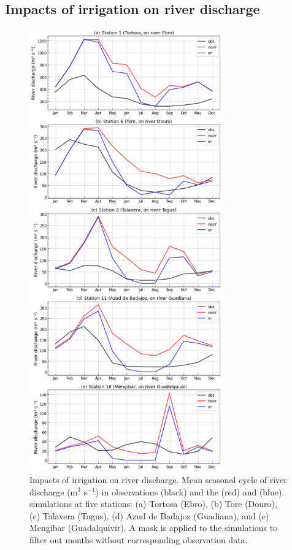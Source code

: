 \subsection{Impacts of irrigation on river discharge}

\begin{figure}[htbp]
    \centering
    \includegraphics[width=8.3cm]{images/chap4/f05.png} 
    \caption{Impacts of irrigation on river discharge. Mean seasonal cycle of river discharge (m$^3$ s$^{-1}$) in observations (black) and the \noirr (red) and \irr (blue) simulations at five stations: (a) Tortosa (Ebro), (b) Tore (Douro), (c) Talavera (Tagus), (d) Azud de Badajoz (Guadiana), and (e) Mengibar (Guadalquivir). A mask is applied to the simulations to filter out months without corresponding observation data.}
    \label{fig:discharge_SC}
\end{figure}

